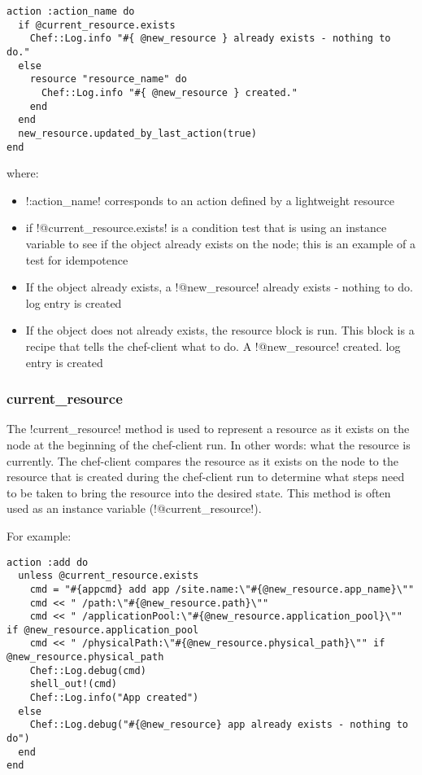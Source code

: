 \begin{lstlisting}[label=lst:cookbook-lwrp-dsl-action]
action :action_name do
  if @current_resource.exists
    Chef::Log.info "#{ @new_resource } already exists - nothing to do."
  else
    resource "resource_name" do
      Chef::Log.info "#{ @new_resource } created."
    end
  end
  new_resource.updated_by_last_action(true)
end
\end{lstlisting}

where:

\begin{itemize}
  \item \inline!:action_name! corresponds to an action defined by a lightweight resource
  \item if \inline!@current_resource.exists! is a condition test that is using an instance variable to see if the object already exists on the node; this is an example of a test for idempotence
  \item If the object already exists, a \inline!@new_resource! already exists - nothing to do. log entry is created
  \item If the object does not already exists, the resource block is run. This block is a recipe that tells the chef-client what to do. A \inline!@new_resource! created. log entry is created
\end{itemize}

\subsubsection{current\_resource}

The \inline!current_resource! method is used to represent a resource as it exists on the node at the beginning of the chef-client run. In other words: what the resource is currently. The chef-client compares the resource as it exists on the node to the resource that is created during the chef-client run to determine what steps need to be taken to bring the resource into the desired state. This method is often used as an instance variable (\inline!@current_resource!).

For example:

\begin{lstlisting}[label=lst:cookbook-lwrp-dsl-current-resource]
action :add do
  unless @current_resource.exists
    cmd = "#{appcmd} add app /site.name:\"#{@new_resource.app_name}\""
    cmd << " /path:\"#{@new_resource.path}\""
    cmd << " /applicationPool:\"#{@new_resource.application_pool}\"" if @new_resource.application_pool
    cmd << " /physicalPath:\"#{@new_resource.physical_path}\"" if @new_resource.physical_path
    Chef::Log.debug(cmd)
    shell_out!(cmd)
    Chef::Log.info("App created")
  else
    Chef::Log.debug("#{@new_resource} app already exists - nothing to do")
  end
end
\end{lstlisting}

